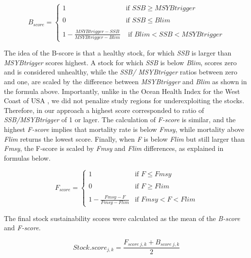 \documentclass[
]{book}
\begin{document}
\begin{equation}
  B_{score} =
    \begin{cases}
      1 & \text{if $SSB \ge MSYBtrigger$}\\
    \\
      0 & \text{if $SSB \le Blim$}\\
    \\
      1 - \frac{MSYBtrigger - SSB}{MSYBtrigger - Blim} & \text{ if $Blim < SSB < MSYBtrigger$}
\label{eq:fscore2}      
    \end{cases}   
\end{equation}

The idea of the B-score is that a healthy stock, for which \emph{SSB} is larger than \emph{MSYBtrigger} scores highest. A stock for which \emph{SSB} is below \emph{Blim}, scores zero and is considered unhealthy, while the \emph{SSB/ MSYBtrigger} ratios between zero and one, are scaled by the difference between \emph{MSYBtrigger} and \emph{Blim} as shown in the formula above. Importantly, unlike in the Ocean Health Index for the West Coast of USA \citep{halpern2014assessing}, we did not penalize study regions for underexploiting the stocks. Therefore, in our approach a highest score corresponded to ratio of \emph{SSB/MSYBtrigger} of 1 or lager.
The calculation of \emph{F-score} is similar, and the highest \emph{F-score} implies that mortality rate is below \emph{Fmsy}, while mortality above \emph{Flim} returns the lowest score. Finally, when \emph{F} is below \emph{Flim} but still larger than \emph{Fmsy}, the F-score is scaled by \emph{Fmsy} and \emph{Flim} differences, as explained in formulas below.

\begin{equation}
  F_{score} =
    \begin{cases}
      1 & \text{if $F \le Fmsy$}\\
    \\  
      0 & \text{if $F \ge Flim $}\\
      \\
      1 - \frac{Fmsy - F}{Fmsy - Flim} & \text{if $Fmsy < F < Flim $}
 \label{eq:fscore}       
    \end{cases}  
\end{equation}

The final stock sustainability scores were calculated as the mean of the \emph{B-score} and \emph{F-score}.

\begin{equation}
Stock.score_{j,k} = \frac{F_{score\ j,k} +B_{score\ j,k}}{2}
 \label{eq:sscore} 
\end{equation}
\end{document}
